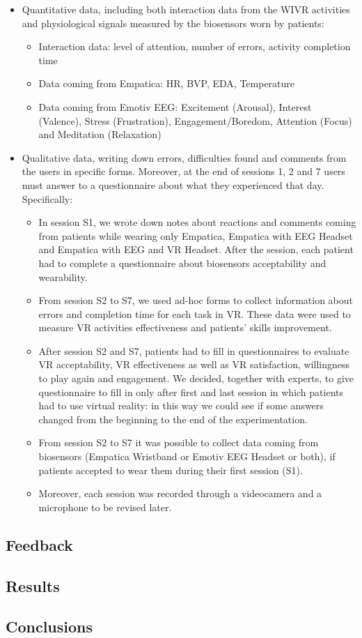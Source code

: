 \begin{itemize}
\item Quantitative data, including both interaction data from the WIVR activities and physiological signals measured by the biosensors worn by patients:
\begin{itemize}
\item Interaction data: level of attention, number of errors, activity completion time
\item Data coming from Empatica: HR, BVP, EDA, Temperature
\item Data coming from Emotiv EEG: Excitement (Arousal), Interest (Valence), Stress (Frustration), Engagement/Boredom, Attention (Focus) and Meditation (Relaxation)
\end{itemize}	
\item Qualitative data, writing down errors, difficulties found and comments from the users in specific forms. Moreover, at the end of sessions 1, 2 and 7 users must answer to a questionnaire about what they experienced that day. Specifically:
\begin{itemize}
\item In session S1, we wrote down notes about reactions and comments coming from patients while wearing only Empatica, Empatica with EEG Headset and Empatica with EEG and VR Headset. After the session, each patient had to complete a questionnaire about biosensors acceptability and wearability.
\item From session S2 to S7, we used ad-hoc forms to collect information about errors and completion time for each task in VR. These data were used to measure VR activities effectiveness and patients' skills improvement.
\item After session S2 and S7, patients had to fill in questionnaires to evaluate VR acceptability, VR effectiveness as well as VR satisfaction, willingness to play again and engagement. We decided, together with experts, to give questionnaire to fill in only after first and last session in which patients had to use virtual reality: in this way we could see if some answers changed from the beginning to the end of the experimentation.
\item From session S2 to S7 it was possible to collect data coming from biosensors (Empatica Wristband or Emotiv EEG Headset or both), if patients accepted to wear them during their first session (S1).
\item Moreover, each session was recorded through a videocamera and a microphone to be revised later.
\end{itemize}
\end{itemize}

\subsection{Feedback}
\subsection{Results}
\subsection{Conclusions}
